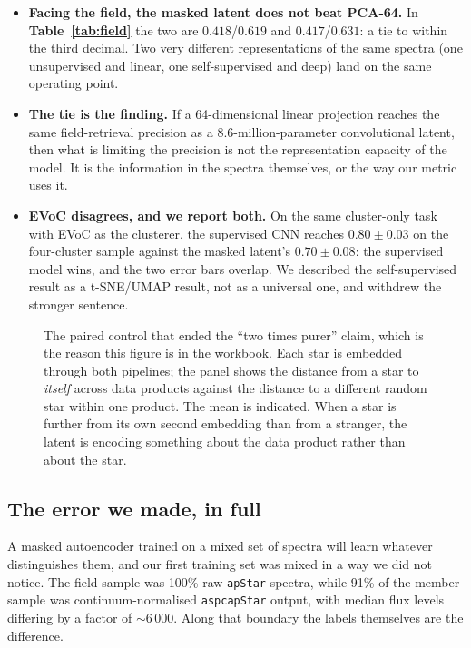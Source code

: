 \begin{itemize}
\item \textbf{Facing the field, the masked latent does not beat PCA-64.} In
\textbf{Table~\ref{tab:field}} the two are $0.418$/$0.619$ and $0.417$/$0.631$:
a tie to within the third decimal. Two very different representations of the
same spectra (one unsupervised and linear, one self-supervised and deep) land
on the same operating point.
\item \textbf{The tie is the finding.} If a 64-dimensional linear projection
  reaches the same field-retrieval precision as a 8.6-million-parameter
  convolutional latent, then what is limiting the precision is not the
  representation capacity of the model. It is the information in the spectra
  themselves, or the way our metric uses it.
\item \textbf{EVoC disagrees, and we report both.} On the same cluster-only
task with EVoC as the clusterer, the supervised CNN reaches $0.80 \pm 0.03$ on
the four-cluster sample against the masked latent's $0.70 \pm 0.08$: the
supervised model wins, and the two error bars overlap. We described the
self-supervised result as a t-SNE/UMAP result, not as a universal one, and
withdrew the stronger sentence.
\end{itemize}

\begin{figure}[htbp]\centering
  \caption{The paired control that ended the ``two times purer'' claim, which
  is the reason this figure is in the workbook. Each star is embedded through
  both pipelines; the panel shows the distance from a star to \emph{itself}
  across data products against the distance to a different random star within
  one product. The mean is indicated. When a star is further from its own
  second embedding than from a stranger, the latent is encoding something
  about the data product rather than about the star.}
  \label{fig:paired}
\end{figure}

\subsection{The error we made, in full}
\label{sec:provenance}

A masked autoencoder trained on a mixed set of spectra will learn whatever
distinguishes them, and our first training set was mixed in a way we did not
notice. The field sample was 100\% raw \texttt{apStar} spectra, while 91\% of
the member sample was continuum-normalised \texttt{aspcapStar} output, with
median flux levels differing by a factor of $\sim\!6\,000$. Along that boundary
the labels themselves are the difference.

